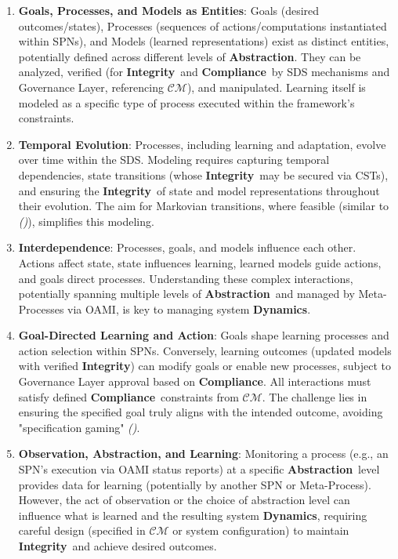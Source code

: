 \documentclass[12pt,a4paper]{report}
\renewcommand{\citep}[1]{\textit{\scriptsize{(\cite{#1})}}}
\newcommand{\Compliance}{\textbf{Compliance}}
\newcommand{\Integrity}{\textbf{Integrity}}
\newcommand{\Abstraction}{\textbf{Abstraction}}
\newcommand{\Dynamics}{\textbf{Dynamics}}
\begin{document}
	\begin{enumerate}
		\item \textbf{Goals, Processes, and Models as Entities}: Goals (desired outcomes/states), Processes (sequences of actions/computations instantiated within SPNs), and Models (learned representations) exist as distinct entities, potentially defined across different levels of \Abstraction. They can be analyzed, verified (for \Integrity\ and \Compliance\ by SDS mechanisms and Governance Layer, referencing $\mathcal{CM}$), and manipulated. Learning itself is modeled as a specific type of process executed within the framework's constraints.
		\item \textbf{Temporal Evolution}: Processes, including learning and adaptation, evolve over time within the SDS. Modeling requires capturing temporal dependencies, state transitions (whose \Integrity\ may be secured via CSTs), and ensuring the \Integrity\ of state and model representations throughout their evolution. The aim for Markovian transitions, where feasible (similar to \citep{Teng2025AtomOfThoughtsRef}), simplifies this modeling.
		\item \textbf{Interdependence}: Processes, goals, and models influence each other. Actions affect state, state influences learning, learned models guide actions, and goals direct processes. Understanding these complex interactions, potentially spanning multiple levels of \Abstraction\ and managed by Meta-Processes via OAMI, is key to managing system \Dynamics.
		\item \textbf{Goal-Directed Learning and Action}: Goals shape learning processes and action selection within SPNs. Conversely, learning outcomes (updated models with verified \Integrity) can modify goals or enable new processes, subject to Governance Layer approval based on \Compliance. All interactions must satisfy defined \Compliance\ constraints from $\mathcal{CM}$. The challenge lies in ensuring the specified goal truly aligns with the intended outcome, avoiding "specification gaming" \citep{AdditionalCitationRef48, Kovac2025SpecGaming}.
		\item \textbf{Observation, Abstraction, and Learning}: Monitoring a process (e.g., an SPN's execution via OAMI status reports) at a specific \Abstraction\ level provides data for learning (potentially by another SPN or Meta-Process). However, the act of observation or the choice of abstraction level can influence what is learned and the resulting system \Dynamics, requiring careful design (specified in $\mathcal{CM}$ or system configuration) to maintain \Integrity\ and achieve desired outcomes.
	\end{enumerate}
	
\end{document}
